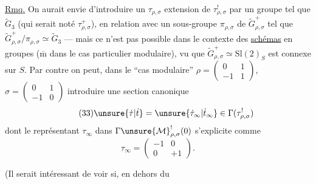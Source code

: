 \uline{Rmq.} On aurait envie d'introduire un $\tau_{\rho,\sigma}$ extension  de $\tau_{\rho,\sigma}^{!}$ par un groupe tel que $\widetilde G_3$ (qui serait noté $\tau_{\rho,\sigma}^{+}$), en relation avec un sous-groupe $\pi_{\rho,\sigma}$ de $\widetilde G_{\rho,\sigma}^{+}$  tel que $\widetilde G_{\rho,\sigma}^{+}/\pi_{\rho,\sigma}\simeq\widetilde G_3$ --- mais ce n'est pas possible dans le contexte des \uline{schémas} en groupes ($\overline{\mathrm m}$ dans le cas particulier modulaire), vu que $\widetilde G_{\rho,\sigma}^{+}\simeq\mathrm{Sl}(2)_S$ est   connexe sur $S$. Par contre on peut, dans le ``cas modulaire'' $\rho=\begin{pmatrix}0&1\\-1&1\end{pmatrix}$, $\sigma=\begin{pmatrix}0&1\\-1&0\end{pmatrix}$ introduire une section canonique
\[
\tag{33}
\unsure{\dot\tau|\dot t}=\unsure{\dot\tau_\infty|\dot t_\infty}\in\Gamma(\tau_{\rho,\sigma}^{!})
\]
dont le représentant $\tau_\infty$ dans $\Gamma\unsure{\mathcal M}_{\rho,\sigma}^{!}(0)$ s'explicite comme
\[
\tag{34}
\tau_\infty=\begin{pmatrix}-1&0\\0&+1\end{pmatrix}.
\]

(Il serait intéressant de voir si, en dehors du


